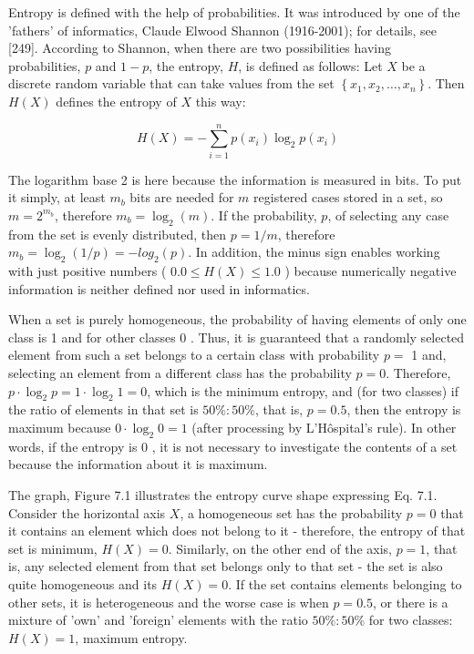 \documentclass[10pt]{book}
\begin{document}
Entropy is defined with the help of probabilities. It was introduced by one of the 'fathers' of informatics, Claude Elwood Shannon (1916-2001); for details, see [249]. According to Shannon, when there are two possibilities having probabilities, $p$ and $1-p$, the entropy, $H$, is defined as follows: Let $X$ be a discrete random variable that can take values from the set $\left\{x_{1}, x_{2}, \ldots, x_{n}\right\}$. Then $H(X)$ defines the entropy of $X$ this way:


\begin{equation*}
H(X)=-\sum_{i=1}^{n} p\left(x_{i}\right) \log _{2} p\left(x_{i}\right) \tag{7.1}
\end{equation*}


The logarithm base 2 is here because the information is measured in bits. To put it simply, at least $m_{b}$ bits are needed for $m$ registered cases stored in a set, so $m=2^{m_{b}}$, therefore $m_{b}=\log _{2}(m)$. If the probability, $p$, of selecting any case from the set is evenly distributed, then $p=1 / m$, therefore $m_{b}=\log _{2}(1 / p)= -l o g_{2}(p)$. In addition, the minus sign enables working with just positive numbers ( $0.0 \leq H(X) \leq 1.0$ ) because numerically negative information is neither defined nor used in informatics.

When a set is purely homogeneous, the probability of having elements of only one class is 1 and for other classes 0 . Thus, it is guaranteed that a randomly selected element from such a set belongs to a certain class with probability $p=$ 1 and, selecting an element from a different class has the probability $p=0$. Therefore, $p \cdot \log _{2} p=1 \cdot \log _{2} 1=0$, which is the minimum entropy, and (for two classes) if the ratio of elements in that set is $50 \%: 50 \%$, that is, $p=0.5$, then the entropy is maximum because $0 \cdot \log _{2} 0=1$ (after processing by L'Hôspital's rule). In other words, if the entropy is 0 , it is not necessary to investigate the contents of a set because the information about it is maximum.

The graph, Figure 7.1 illustrates the entropy curve shape expressing Eq. 7.1. Consider the horizontal axis $X$, a homogeneous set has the probability $p=0$ that it contains an element which does not belong to it - therefore, the entropy of that set is minimum, $H(X)=0$. Similarly, on the other end of the axis, $p=1$, that is, any selected element from that set belongs only to that set - the set is also quite homogeneous and its $H(X)=0$. If the set contains elements belonging to other sets, it is heterogeneous and the worse case is when $p=0.5$, or there is a mixture of 'own' and 'foreign' elements with the ratio $50 \%: 50 \%$ for two classes: $H(X)=1$, maximum entropy.
\end{document}
